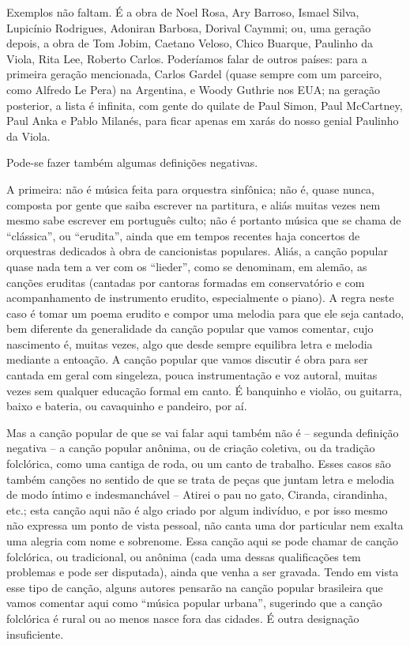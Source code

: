 Exemplos não faltam. É a obra de Noel Rosa, Ary Barroso, Ismael Silva,
Lupicínio Rodrigues, Adoniran Barbosa, Dorival Caymmi; ou, uma geração
depois, a obra de Tom Jobim, Caetano Veloso, Chico Buarque, Paulinho da
Viola, Rita Lee, Roberto Carlos. Poderíamos falar de outros países: para
a primeira geração mencionada, Carlos Gardel (quase sempre com um
parceiro, como Alfredo Le Pera) na Argentina, e Woody Guthrie nos EUA;
na geração posterior, a lista é infinita, com gente do quilate de Paul
Simon, Paul McCartney, Paul Anka e Pablo Milanés, para ficar apenas em
xarás do nosso genial Paulinho da Viola.

Pode-se fazer também algumas definições negativas.

A primeira: não é música feita para orquestra sinfônica; não é, quase
nunca, composta por gente que saiba escrever na partitura, e aliás
muitas vezes nem mesmo sabe escrever em português culto; não é portanto
música que se chama de ``clássica'', ou ``erudita'', ainda que em tempos
recentes haja concertos de orquestras dedicados à obra de cancionistas
populares. Aliás, a canção popular quase nada tem a ver com os
``lieder'', como se denominam, em alemão, as canções eruditas (cantadas
por cantoras formadas em conservatório e com acompanhamento de
instrumento erudito, especialmente o piano). A regra neste caso é tomar
um poema erudito e compor uma melodia para que ele seja cantado, bem
diferente da generalidade da canção popular que vamos comentar, cujo
nascimento é, muitas vezes, algo que desde sempre equilibra letra e
melodia mediante a entoação. A canção popular que vamos discutir é obra
para ser cantada em geral com singeleza, pouca instrumentação e voz
autoral, muitas vezes sem qualquer educação formal em canto. É banquinho
e violão, ou guitarra, baixo e bateria, ou cavaquinho e pandeiro, por
aí.

Mas a canção popular de que se vai falar aqui também não é -- segunda
definição negativa -- a canção popular anônima, ou de criação coletiva,
ou da tradição folclórica, como uma cantiga de roda, ou um canto de
trabalho. Esses casos são também canções no sentido de que se trata de
peças que juntam letra e melodia de modo íntimo e indesmanchável --
Atirei o pau no gato, Ciranda, cirandinha, etc.; esta canção aqui não é
algo criado por algum indivíduo, e por isso mesmo não expressa um ponto
de vista pessoal, não canta uma dor particular nem exalta uma alegria
com nome e sobrenome. Essa canção aqui se pode chamar de canção
folclórica, ou tradicional, ou anônima (cada uma dessas qualificações
tem problemas e pode ser disputada), ainda que venha a ser gravada.
Tendo em vista esse tipo de canção, alguns autores pensarão na canção
popular brasileira que vamos comentar aqui como ``música popular
urbana'', sugerindo que a canção folclórica é rural ou ao menos nasce
fora das cidades. É outra designação insuficiente.

